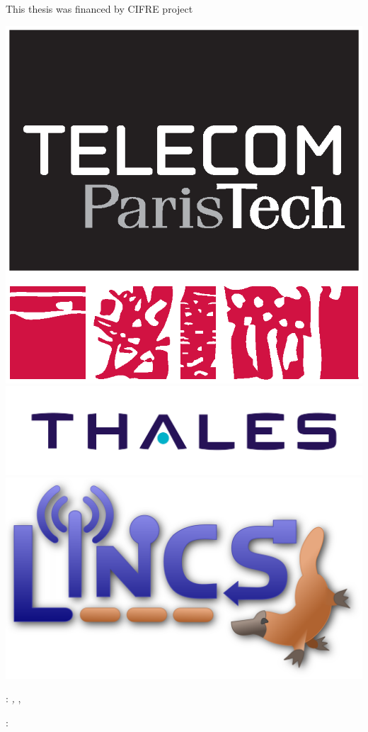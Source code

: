 
\thispagestyle{empty}

This thesis was financed by CIFRE project

\includegraphics[scale=0.2]{img/logos/telecom.eps}
\includegraphics[scale=0.2]{img/logos/thales.jpg}
\includegraphics[scale=0.12]{img/logos/lincs_pupuce.png}

\vfill

\noindent\myName: \textit{\myTitle,} \mySubtitle, \myTime


\bigskip

: \\
\Claude \\
\Jeremie \\ 
\Paolo \\
